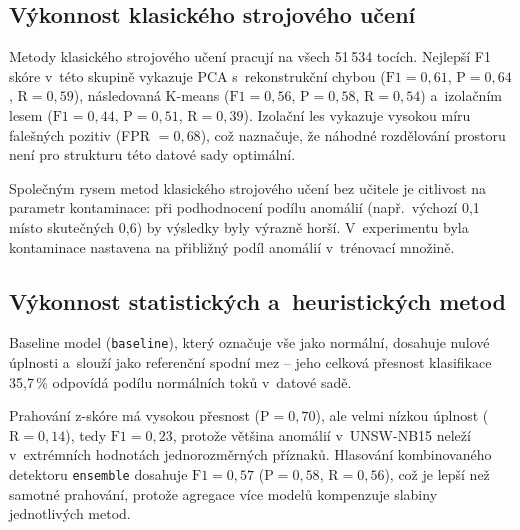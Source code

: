 \subsection{Výkonnost klasického strojového učení}
\label{sec:vykon-klasicke-ml}

Metody klasického strojového učení pracují na všech 51\,534 tocích. Nejlepší F1 skóre v~této skupině vykazuje PCA s~rekonstrukční chybou ($\text{F1} = 0{,}61$, $\text{P} = 0{,}64$, $\text{R} = 0{,}59$), následovaná K-means ($\text{F1} = 0{,}56$, $\text{P} = 0{,}58$, $\text{R} = 0{,}54$) a~izolačním lesem ($\text{F1} = 0{,}44$, $\text{P} = 0{,}51$, $\text{R} = 0{,}39$). Izolační les vykazuje vysokou míru falešných pozitiv (FPR $= 0{,}68$), což naznačuje, že náhodné rozdělování prostoru není pro strukturu této datové sady optimální.

Společným rysem metod klasického strojového učení bez učitele je citlivost na parametr kontaminace: při podhodnocení podílu anomálií (např.~výchozí 0{,}1 místo skutečných 0{,}6) by výsledky byly výrazně horší. V~experimentu byla kontaminace nastavena na přibližný podíl anomálií v~trénovací množině.

\subsection{Výkonnost statistických a~heuristických metod}
\label{sec:vykon-stat}

Baseline model (\texttt{baseline}), který označuje vše jako normální, dosahuje nulové úplnosti a~slouží jako referenční spodní mez -- jeho celková přesnost klasifikace 35{,}7\,\% odpovídá podílu normálních toků v~datové sadě.

Prahování z-skóre má vysokou přesnost ($\text{P} = 0{,}70$), ale velmi nízkou úplnost ($\text{R} = 0{,}14$), tedy $\text{F1} = 0{,}23$, protože většina anomálií v~UNSW-NB15 neleží v~extrémních hodnotách jednorozměrných příznaků. Hlasování kombinovaného detektoru \texttt{ensemble} dosahuje $\text{F1} = 0{,}57$ ($\text{P} = 0{,}58$, $\text{R} = 0{,}56$), což je lepší než samotné prahování, protože agregace více modelů kompenzuje slabiny jednotlivých metod.

